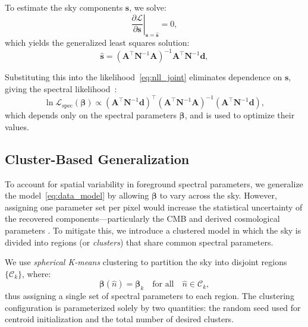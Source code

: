 \documentclass[fleqn,usenatbib]{mnras}
\begin{document}
To estimate the sky components \( \mathbf{s} \), we solve:
\begin{equation}
    \left. \frac{\partial \mathcal{L}}{\partial \mathbf{s}} \right|_{\mathbf{s} = \hat{\mathbf{s}}} = 0,
\end{equation}
which yields the generalized least squares solution:
\begin{equation}
    \hat{\mathbf{s}} = \left( \mathbf{A}^\top \mathbf{N}^{-1} \mathbf{A} \right)^{-1} \mathbf{A}^\top \mathbf{N}^{-1} \mathbf{d},
    \label{eq:mle_solution}
\end{equation}

Substituting this into the likelihood~\eqref{eq:nll_joint} eliminates dependence on \( \mathbf{s} \), giving the spectral likelihood~\citep{Stompor_2009}:
\begin{equation}
    \ln \mathcal{L}_{\mathrm{spec}}(\boldsymbol{\beta}) \propto (\mathbf{A}^\top \mathbf{N}^{-1} \mathbf{d})^\top (\mathbf{A}^\top \mathbf{N}^{-1} \mathbf{A})^{-1} (\mathbf{A}^\top \mathbf{N}^{-1} \mathbf{d}),
    \label{eq:spectral_likelihood}
\end{equation}
which depends only on the spectral parameters \( \boldsymbol{\beta} \), and is used to optimize their values.

\subsection{Cluster-Based Generalization}
\label{subsec:sph_kmeans}

To account for spatial variability in foreground spectral parameters, we generalize the model~\eqref{eq:data_model} by allowing \( \boldsymbol{\beta} \) to vary across the sky. However, assigning one parameter set per pixel would increase the statistical uncertainty of the recovered components—particularly the CMB and derived cosmological parameters \citep{Errard2015}. To mitigate this, we introduce a clustered model in which the sky is divided into regions (or \textit{clusters}) that share common spectral parameters.

We use \textit{spherical K-means} clustering to partition the sky into disjoint regions \( \{ \mathcal{C}_k \} \), where:
\[
\boldsymbol{\beta}(\hat{n}) = \boldsymbol{\beta}_k \quad \text{for all} \quad \hat{n} \in \mathcal{C}_k,
\]
thus assigning a single set of spectral parameters to each region. The clustering configuration is parameterized solely by two quantities: the random seed used for centroid initialization and the total number of desired clusters.
\end{document}
